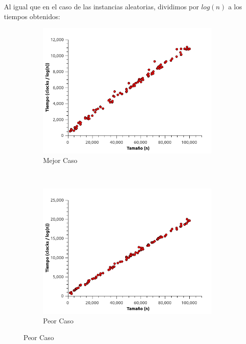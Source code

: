 Al igual que en el caso de las instancias aleatorias, dividimos por $log(n)$ a los tiempos obtenidos:

\begin{figure}[H]
        \centering
        \begin{subfigure}[b]{0.5\textwidth}
                \includegraphics[width=\textwidth]{imagenes/grafico1-mejor2.jpg}
                \caption{Mejor Caso}
        \end{subfigure}%
        ~ %
        \begin{subfigure}[b]{0.5\textwidth}
                \includegraphics[width=\textwidth]{imagenes/grafico1-peor2.jpg}
                \caption{Peor Caso}
        \end{subfigure}

\end{figure}

